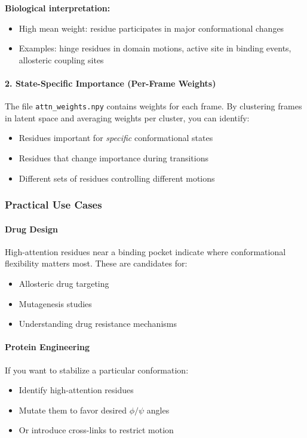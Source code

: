 \documentclass[12pt,a4paper]{article}
\begin{document}
\textbf{Biological interpretation:}
\begin{itemize}
    \item High mean weight: residue participates in major conformational changes
    \item Examples: hinge residues in domain motions, active site in binding events, allosteric coupling sites
\end{itemize}

\paragraph{2. State-Specific Importance (Per-Frame Weights)}
The file \texttt{attn\_weights.npy} contains weights for each frame. By clustering frames in latent space and averaging weights per cluster, you can identify:
\begin{itemize}
    \item Residues important for \textit{specific} conformational states
    \item Residues that change importance during transitions
    \item Different sets of residues controlling different motions
\end{itemize}

\subsubsection{Practical Use Cases}

\paragraph{Drug Design}
High-attention residues near a binding pocket indicate where conformational flexibility matters most. These are candidates for:
\begin{itemize}
    \item Allosteric drug targeting
    \item Mutagenesis studies
    \item Understanding drug resistance mechanisms
\end{itemize}

\paragraph{Protein Engineering}
If you want to stabilize a particular conformation:
\begin{itemize}
    \item Identify high-attention residues
    \item Mutate them to favor desired $\phi/\psi$ angles
    \item Or introduce cross-links to restrict motion
\end{itemize}
\end{document}
